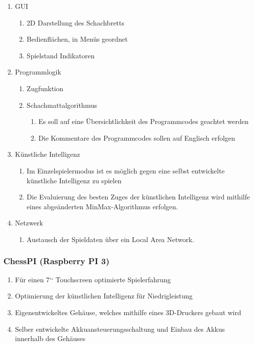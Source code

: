 \documentclass[12pt,a4paper]{article}
\begin{document}
{\begin{enumerate}
	\item{GUI}
	\begin{enumerate}
		\item{2D Darstellung des Schachbretts}
		\item{Bedienflächen, in Menüs geordnet}
		\item{Spielstand Indikatoren}
	\end{enumerate}
	\item{Programmlogik}
	\begin{enumerate}
		\item{Zugfunktion}
		\item{Schachmattalgorithmus}
		\begin{enumerate}
			\item{Es soll auf eine Übersichtlichkeit des Programmcodes geachtet werden}
			\item{Die Kommentare des Programmcodes sollen auf Englisch erfolgen}
		\end{enumerate}
	\end{enumerate}
	\item{Künstliche Intelligenz}
	\begin{enumerate}
		\item{Im Einzelspielermodus ist es möglich gegen eine selbst entwickelte künstliche Intelligenz zu spielen}
		\item{Die Evaluierung des besten Zuges der künstlichen Intelligenz wird mithilfe eines abgeänderten MinMax-Algorithmus erfolgen.}
	\end{enumerate}
	\item{Netzwerk}
	\begin{enumerate}
		\item{Austausch der Spieldaten über ein Local Area Network.}
	\end{enumerate}
\end{enumerate}

\subsubsection{ChessPI (Raspberry PI 3)}

\begin{enumerate}
	\item{Für einen 7‘‘ Touchscreen optimierte Spielerfahrung}
	\item{Optimierung der künstlichen Intelligenz für Niedrigleistung}
	\item{Eigenentwickeltes Gehäuse, welches mithilfe eines 3D-Druckers gebaut wird}
	\item{Selber entwickelte Akkuansteuerungsschaltung und Einbau des Akkus innerhalb des Gehäuses}
\end{enumerate}

}
\end{document}

